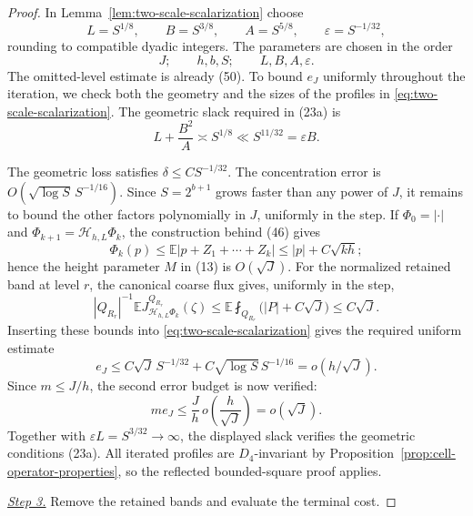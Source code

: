 \documentclass{aomart}
\theoremstyle{definition}
\newcommand{\1}{\mathbf 1}
\begin{document}
\begin{proof}
In Lemma~\ref{lem:two-scale-scalarization} choose
\begin{equation}
L=S^{1/8},\qquad B=S^{3/8},\qquad A=S^{5/8},
\qquad\varepsilon=S^{-1/32},
\tag{51}
\end{equation}
rounding to compatible dyadic integers.  The parameters are chosen in
the order
\[
J;\qquad h,b,S;\qquad L,B,A,\varepsilon.
\]
The omitted-level estimate is already (50).  To bound $e_J$ uniformly
throughout the iteration, we check both the geometry and the sizes of
the profiles in \eqref{eq:two-scale-scalarization}.  The geometric
slack required in (23a) is
\begin{equation*}
L+\frac{B^2}{A}\asymp S^{1/8}
\ll S^{11/32}=\varepsilon B.
\end{equation*}

The geometric loss satisfies $\delta\leq CS^{-1/32}$.
The concentration error is $O(\sqrt{\log S}\,S^{-1/16})$.
Since $S=2^{b+1}$ grows faster than any power of $J$, it remains to
bound the other factors polynomially in $J$, uniformly in the step.
If
$\Phi_ 0=|\cdot|$ and
$\Phi_ {k+1}=\mathcal H_ {h,L}\Phi_ k$, the construction behind (46)
gives
\begin{equation}
\Phi_ k(p)\leq\mathbb E|p+Z_ 1+\cdots+Z_ k|
\leq |p|+C\sqrt{kh};
\tag{52}
\end{equation}
hence the height parameter $M$ in (13) is $O(\sqrt J)$.
For the normalized retained band at level $r$, the canonical coarse flux
gives, uniformly in the step,
\begin{equation}
|Q_{R_r}|^{-1}\mathbb EJ_ {\mathcal H_ {h,L}\Phi_ k}^{Q_{R_r}}(\zeta)
\leq\mathbb E\fint_{Q_{R_r}}\bigl(|P|+C\sqrt J\bigr)\leq C\sqrt J.
\tag{52a}
\end{equation}
Inserting these bounds into \eqref{eq:two-scale-scalarization} gives
the required uniform estimate
\begin{equation}
e_ J\leq C\sqrt J\,S^{-1/32}
+C\sqrt{\log S}\,S^{-1/16}=o(h/\sqrt J).
\tag{52b}
\end{equation}
Since $m\leq J/h$, the second error budget is now verified:
\begin{equation*}
m e_J\leq\frac{J}{h}\,
o\!\left(\frac{h}{\sqrt J}\right)=o(\sqrt J).
\end{equation*}
Together with $\varepsilon L=S^{3/32}\to\infty$, the displayed slack
verifies the geometric conditions (23a).
All iterated profiles are $D_ 4$-invariant by Proposition~\ref{prop:cell-operator-properties}, so the reflected bounded-square proof applies.

\smallskip\noindent
\underline{\textit{Step 3.}} Remove the retained bands and evaluate the terminal cost.


\end{proof}
\end{document}
